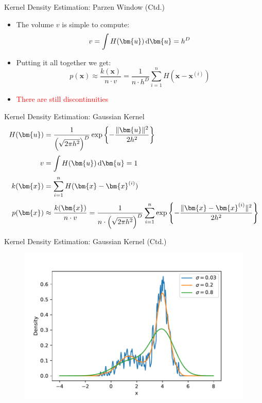 \begin{frame}{Kernel Density Estimation: Parzen Window (Ctd.)}{}\important
	\begin{itemize}
		\item The volume $v$ is simple to compute:
		\begin{equation}
			v = \int H(\bm{u}) \diff \bm{u} = h^D
		\end{equation}
		\item Putting it all together we get:
		\begin{equation}
			p(\bm{x}) \approx \frac{k(\bm{x})}{n \cdot v} = \frac{1}{n \cdot h^D} \sum_{i=1}^n H(\bm{x} - \bm{x}^{(i)})
		\end{equation}
		\item {} \textcolor{red}{There are still discontinuities}
	\end{itemize}
\end{frame}


\begin{frame}{Kernel Density Estimation: Gaussian Kernel}{}\optional
	\begin{align}
		H(\bm{u})
			&= \frac{1}{\left( \sqrt{2 \pi h^2} \right)^D} \exp\left\{ -\frac{\Vert \bm{u} \Vert^2}{2 h^2} \right\} \\[1mm]
		v
			&= \int H(\bm{u}) \diff \bm{u} = 1 \\[1mm]
		k(\bm{x})
			&= \sum_{i=1}^n H(\bm{x} - \bm{x}^{(i)}) \\[1mm]
		p(\bm{x})
			&\approx \frac{k(\bm{x})}{n \cdot v} =
				\frac{1}{n \cdot \left( \sqrt{2 \pi h^2} \right)^D} \sum_{i=1}^n \exp\left\{ -\frac{\Vert \bm{x} - \bm{x}^{(i)} \Vert^2}{2 h^2} \right\}
	\end{align}
\end{frame}


\begin{frame}{Kernel Density Estimation: Gaussian Kernel (Ctd.)}
	\begin{figure}
		\centering
		\includegraphics[scale=0.55]{04_density_estimation/02_img/kde}
	\end{figure}
\end{frame}


